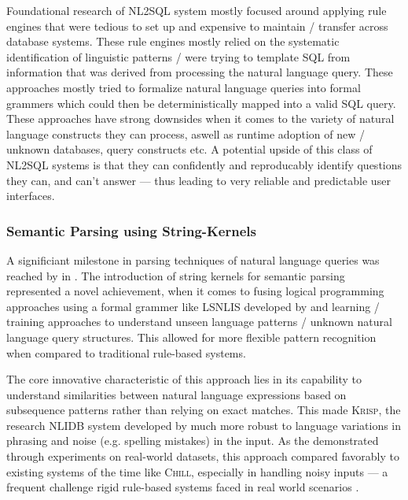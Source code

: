 \documentclass{article}
\begin{document}
Foundational research of NL2SQL system mostly focused around applying rule engines that were tedious to set up and
expensive to maintain / transfer across database systems. These rule engines mostly relied on the systematic 
identification of linguistic patterns / were trying to template SQL from information that was derived from processing the 
natural language query. \citep{Rendezvous, Lunar, Ladder} These approaches mostly tried to formalize natural language 
queries into formal grammers which could then be deterministically mapped into a valid SQL query. \citep{Lunar} These 
approaches have strong downsides when it comes to the variety of natural language constructs they can process, aswell as 
runtime adoption of new / unknown databases, query constructs etc. A potential upside of this class of NL2SQL systems is 
that they can confidently and reproducably identify questions they can, and can't answer — thus leading to very reliable 
and predictable user interfaces.

\subsubsection{Semantic Parsing using String-Kernels}

A significiant milestone in parsing techniques of natural language queries was reached by \citeauthor*{StringKernels} in 
\citeyear{StringKernels}. The introduction of string kernels for semantic parsing represented a novel achievement, when 
it comes to fusing logical programming approaches using a formal grammer like LSNLIS developed by \cite{Lunar} and 
learning / training approaches to understand unseen language patterns / unknown natural language query structures. This 
allowed for more flexible pattern recognition when compared to traditional rule-based systems.

The core innovative characteristic of this approach lies in its capability to understand similarities between natural 
language expressions based on subsequence patterns rather than relying on exact matches. This made \textsc{Krisp}, the 
research NLIDB system developed by \cite{StringKernels} much more robust to language variations in phrasing and noise 
(e.g. spelling mistakes) in the input. As the \citeauthor*{StringKernels} demonstrated through experiments on real-world 
datasets, this approach compared favorably to existing systems of the time like \textsc{Chill}, especially in handling 
noisy inputs — a frequent challenge rigid rule-based systems faced in real world scenarios \citep{StringKernels, 
ILPParsing}.
\end{document}

